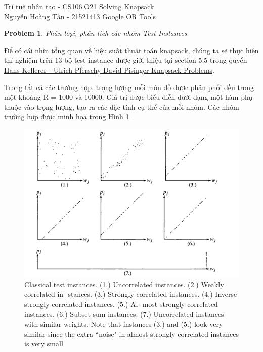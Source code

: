 \documentclass[12pt]{article}
\newtheorem{problem}{Problem}
\begin{document}
\graphicspath{ {Figs/} } 

\noindent Trí tuệ nhân tạo - CS106.O21 \hfill Solving Knapsack \\
Nguyễn Hoàng Tân - 21521413 \hfill  Google OR Tools 

\hrulefill


\begin{problem}
	Phân loại, phân tích các nhóm Test Instances
\end{problem}
Để có cái nhìn tổng quan về hiệu suất thuật toán knapsack, chúng ta sẽ thực hiện thí nghiệm trên 13 bộ test instance được giới thiệu tại section 5.5 trong quyển \href{https://github.com/Dev-Aligator/UIT/blob/master/CS106.O21/KnapsackORTools/vdoc.pub_knapsack-problems.pdf}{Hans Kellerer - Ulrich Pferschy David Pisinger Knapsack Problems}. 

Trong tất cả các trường hợp, trọng lượng mỗi món đồ được phân phối đều trong một khoảng R = 1000 và 10000. Giá trị được biểu diễn dưới dạng một hàm phụ thuộc vào trọng lượng, tạo ra các đặc tính cụ thể của mỗi nhóm. Các nhóm trường hợp được minh họa trong Hình \ref{fig:test_instances}. \\

\begin{figure}[H]
	\centering
	\includegraphics[scale=0.34]{Test_Instances_Fig.png}
	\caption{Classical test instances. (1.) Uncorrelated instances. (2.) Weakly correlated in-
	stances. (3.) Strongly correlated instances. (4.) Inverse strongly correlated instances. (5.) Al-
	most strongly correlated instances. (6.) Subset sum instances. (7.) Uncorrelated instances with
	similar weights. Note that instances (3.) and (5.) look very similar since the extra “noise" in
	almost strongly correlated instances is very small.}
	\label{fig:test_instances}
\end{figure}
\end{document}
